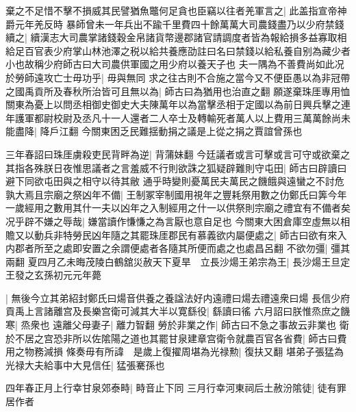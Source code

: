 棄之不足惜不擊不損威其民譬猶魚鼈何足貪也臣竊以往者羌軍言之|{
	此盖指宣帝神爵元年羌反時}
暴師曾未一年兵出不踰千里費四十餘萬萬大司農錢盡乃以少府禁錢續之|{
	續漢志大司農掌諸錢穀金帛諸貨幣邊郡諸官請調度者皆為報給損多益寡取相給足百官表少府掌山林池澤之税以給共養應劭註曰名曰禁錢以給私養自别為藏少者小也故稱少府師古曰大司農供軍國之用少府以養天子也}
夫一隅為不善費尚如此况於勞師遠攻亡士毋功乎|{
	毋與無同}
求之往古則不合施之當今又不便臣愚以為非冠帶之國禹貢所及春秋所治皆可且無以為|{
	師古曰為猶用也治直之翻}
願遂棄珠厓專用恤關東為憂上以問丞相御史御史大夫陳萬年以為當擊丞相于定國以為前日興兵擊之連年護軍都尉校尉及丞凡十一人還者二人卒士及轉輸死者萬人以上費用三萬萬餘尚未能盡降|{
	降戶江翻}
今關東困乏民難揺動捐之議是上從之捐之賈誼曾孫也

三年春詔曰珠厓虜殺吏民背畔為逆|{
	背蒲妹翻}
今廷議者或言可擊或言可守或欲棄之其指各殊朕日夜惟思議者之言羞威不行則欲誅之狐疑辟難則守屯田|{
	師古曰辟讀曰避下同欲屯田與之相守以待其敝}
通乎時變則憂萬民夫萬民之饑餓與遠蠻之不討危孰大焉且宗廟之祭凶年不備|{
	王制冢宰制國用視年之豐耗祭用數之仂鄭氏曰筭今年一歲經用之數用其什一夫以凶年之入制經用之什一以供祭則宗廟之禮宜有不備者矣}
况乎辟不嫌之辱哉|{
	嫌當讀作慊慊之為言厭也意自足也}
今關東大困倉庫空虛無以相贍又以動兵非特勞民凶年隨之其罷珠厓郡民有慕義欲内屬便處之|{
	師古曰欲有來入内郡者所至之處即安置之余謂便處者各隨其所便而處之也處昌呂翻}
不欲勿彊|{
	彊其兩翻}
夏四月乙未晦茂陵白鶴舘災赦天下夏旱　立長沙煬王弟宗為王|{
	長沙煬王旦定王發之玄孫初元元年薨}


|{
	無後今立其弟紹封鄭氏曰煬音供養之養諡法好内遠禮曰煬去禮遠衆曰煬}
長信少府貢禹上言諸離宫及長樂宫衛可減其大半以寛繇役|{
	繇讀曰徭}
六月詔曰朕惟烝庶之饑寒|{
	烝衆也}
遠離父母妻子|{
	離力智翻}
勞於非業之作|{
	師古曰不急之事故云非業也}
衛於不居之宫恐非所以佐隂陽之道也其罷甘泉建章宫衛令就農百官各省費|{
	師古曰費用之物務減損}
條奏毋有所諱　是歲上復擢周堪為光禄勲|{
	復扶又翻}
堪弟子張猛為光禄大夫給事中大見信任|{
	猛張騫孫也}


四年春正月上行幸甘泉郊泰畤|{
	畤音止下同}
三月行幸河東祠后土赦汾隂徒|{
	徒有罪居作者}


